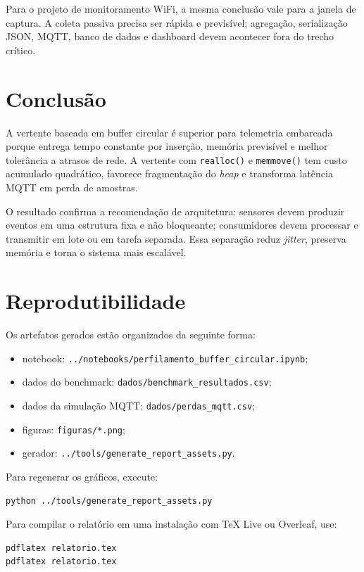 \documentclass[12pt,a4paper]{article}
\begin{document}
Para o projeto de monitoramento WiFi, a mesma conclusão vale para a janela de captura. A coleta passiva precisa ser rápida e previsível; agregação, serialização JSON, MQTT, banco de dados e dashboard devem acontecer fora do trecho crítico.

\section{Conclusão}

A vertente baseada em buffer circular é superior para telemetria embarcada porque entrega tempo constante por inserção, memória previsível e melhor tolerância a atrasos de rede. A vertente com \texttt{realloc()} e \texttt{memmove()} tem custo acumulado quadrático, favorece fragmentação do \textit{heap} e transforma latência MQTT em perda de amostras.

O resultado confirma a recomendação de arquitetura: sensores devem produzir eventos em uma estrutura fixa e não bloqueante; consumidores devem processar e transmitir em lote ou em tarefa separada. Essa separação reduz \textit{jitter}, preserva memória e torna o sistema mais escalável.

\section{Reprodutibilidade}

Os artefatos gerados estão organizados da seguinte forma:

\begin{itemize}
    \item notebook: \texttt{../notebooks/perfilamento\_buffer\_circular.ipynb};
    \item dados do benchmark: \texttt{dados/benchmark\_resultados.csv};
    \item dados da simulação MQTT: \texttt{dados/perdas\_mqtt.csv};
    \item figuras: \texttt{figuras/*.png};
    \item gerador: \texttt{../tools/generate\_report\_assets.py}.
\end{itemize}

Para regenerar os gráficos, execute:

\begin{lstlisting}[style=codestyle]
python ../tools/generate_report_assets.py
\end{lstlisting}

Para compilar o relatório em uma instalação com TeX Live ou Overleaf, use:

\begin{lstlisting}[style=codestyle]
pdflatex relatorio.tex
pdflatex relatorio.tex
\end{lstlisting}
\end{document}
